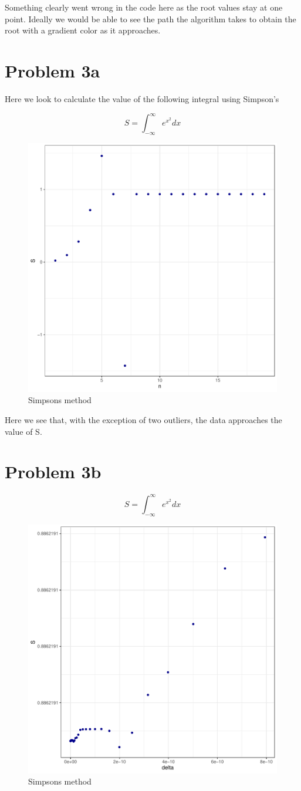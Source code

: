 \documentclass[prb,twocolumn]{revtex4-2}
\begin{document}
Something clearly went wrong in the code here as the root values stay at one point. Ideally we would be able to see the path the algorithm takes to obtain the root with a gradient color as it approaches.

\section{Problem 3a}

Here we look to calculate the value of the following integral using Simpson's

$$ S = \int_{-\infty}^\infty e^{x^2}dx $$

\begin{figure}[h!]
\centerline{\includegraphics [width=3 in] {simpsons}} \caption{Simpsons method} \label{simpsons}
\end{figure}

Here we see that, with the exception of two outliers, the data approaches the value of S.

\section{Problem 3b}

$$ S = \int_{-\infty}^\infty e^{x^2}dx $$

\begin{figure}[h!]
\centerline{\includegraphics [width=3 in] {simpsons_adapt}} \caption{Simpsons method} \label{simpsons_adapt}
\end{figure}
\end{document}
